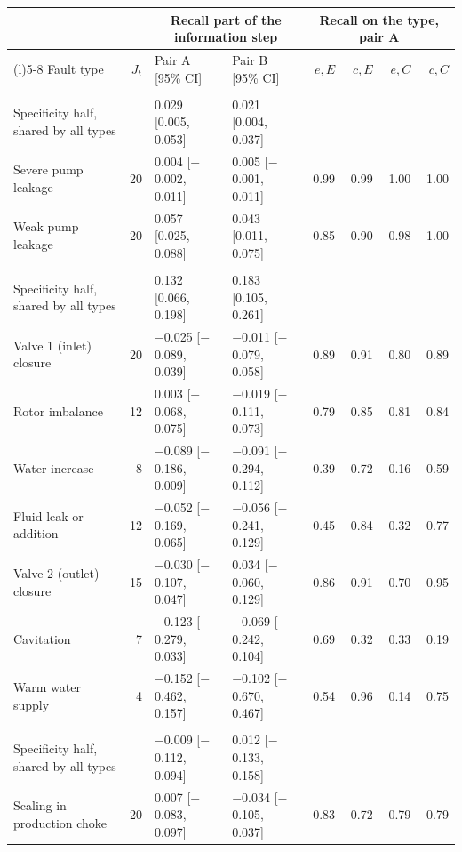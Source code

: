 \begin{tabular}{@{}>{\raggedright\arraybackslash}p{2.8cm} r l l rrrr@{}}
\toprule
& & \multicolumn{2}{c}{Recall part of the information step} & \multicolumn{4}{c}{Recall on the type, pair A} \\
\cmidrule(lr){3-4}\cmidrule(l){5-8}
Fault type & $J_t$ & Pair A [95\% CI] & Pair B [95\% CI] & $e,E$ & $c,E$ & $e,C$ & $c,C$ \\
\midrule
\multicolumn{8}{@{}l}{\textit{Hydraulic}} \\
Specificity half, shared by all types & & 0.029 [0.005, 0.053] & 0.021 [0.004, 0.037] & & & &  \\
Severe pump leakage & 20 & 0.004 [$-$0.002, 0.011] & 0.005 [$-$0.001, 0.011] & 0.99 & 0.99 & 1.00 & 1.00 \\
Weak pump leakage & 20 & 0.057 [0.025, 0.088] & 0.043 [0.011, 0.075] & 0.85 & 0.90 & 0.98 & 1.00 \\
\multicolumn{8}{@{}l}{\textit{SKAB}} \\
Specificity half, shared by all types & & 0.132 [0.066, 0.198] & 0.183 [0.105, 0.261] & & & &  \\
Valve 1 (inlet) closure & 20 & $-$0.025 [$-$0.089, 0.039] & $-$0.011 [$-$0.079, 0.058] & 0.89 & 0.91 & 0.80 & 0.89 \\
Rotor imbalance & 12 & 0.003 [$-$0.068, 0.075] & $-$0.019 [$-$0.111, 0.073] & 0.79 & 0.85 & 0.81 & 0.84 \\
Water increase & 8 & $-$0.089 [$-$0.186, 0.009] & $-$0.091 [$-$0.294, 0.112] & 0.39 & 0.72 & 0.16 & 0.59 \\
Fluid leak or addition & 12 & $-$0.052 [$-$0.169, 0.065] & $-$0.056 [$-$0.241, 0.129] & 0.45 & 0.84 & 0.32 & 0.77 \\
Valve 2 (outlet) closure & 15 & $-$0.030 [$-$0.107, 0.047] & 0.034 [$-$0.060, 0.129] & 0.86 & 0.91 & 0.70 & 0.95 \\
Cavitation & 7 & $-$0.123 [$-$0.279, 0.033] & $-$0.069 [$-$0.242, 0.104] & 0.69 & 0.32 & 0.33 & 0.19 \\
Warm water supply & 4 & $-$0.152 [$-$0.462, 0.157] & $-$0.102 [$-$0.670, 0.467] & 0.54 & 0.96 & 0.14 & 0.75 \\
\multicolumn{8}{@{}l}{\textit{3W}} \\
Specificity half, shared by all types & & $-$0.009 [$-$0.112, 0.094] & 0.012 [$-$0.133, 0.158] & & & &  \\
Scaling in production choke & 20 & 0.007 [$-$0.083, 0.097] & $-$0.034 [$-$0.105, 0.037] & 0.83 & 0.72 & 0.79 & 0.79 \\

\end{tabular}
